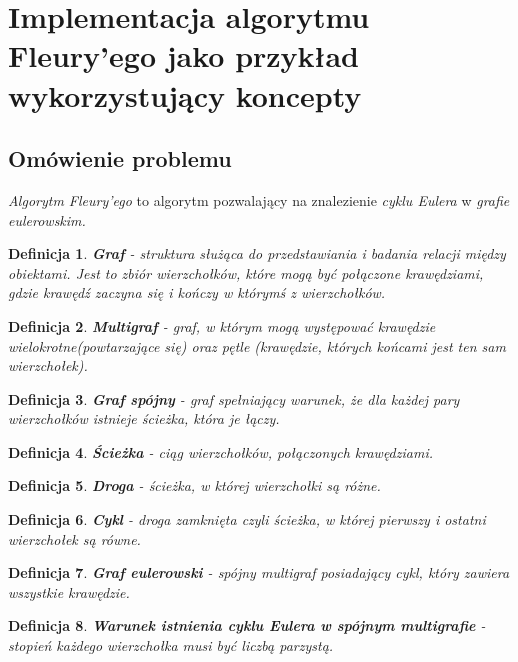 \documentclass[11pt, a4paper]{article}
\begin{document}
\lstset{language=C++}

\section{Implementacja algorytmu Fleury'ego jako przykład wykorzystujący koncepty}

\subsection{Omówienie problemu}
\emph{Algorytm Fleury'ego} to algorytm pozwalający na znalezienie \emph{cyklu Eulera} w \emph{grafie eulerowskim.}

\newtheorem{mydef}{Definicja}

\begin{mydef}
\textbf{Graf} - struktura służąca do przedstawiania i badania relacji między obiektami. Jest to zbiór wierzchołków, które mogą być połączone krawędziami, gdzie krawędź zaczyna się i kończy w którymś z wierzchołków.
\end{mydef}

\begin{mydef}
\textbf{Multigraf} - graf, w którym mogą występować krawędzie wielokrotne(powtarzające się) oraz pętle (krawędzie, których końcami jest ten sam wierzchołek).
\end{mydef}

\begin{mydef}
\textbf{Graf spójny} - graf spełniający warunek, że dla każdej pary wierzchołków istnieje ścieżka, która je łączy.
\end{mydef}

\begin{mydef}
\textbf{Ścieżka} - ciąg wierzchołków, połączonych krawędziami.
\end{mydef}

\begin{mydef}
\textbf{Droga} - ścieżka, w której wierzchołki są różne.
\end{mydef}

\begin{mydef}
\textbf{Cykl} - droga zamknięta czyli ścieżka, w której pierwszy i ostatni wierzchołek są równe.
\end{mydef}

\begin{mydef}
\textbf{Graf eulerowski} - spójny multigraf posiadający cykl, który zawiera wszystkie krawędzie. 
\end{mydef}

\begin{mydef}
\textbf{Warunek istnienia cyklu Eulera w spójnym multigrafie} - stopień każdego wierzchołka musi być liczbą parzystą.
\end{mydef}
\end{document}
